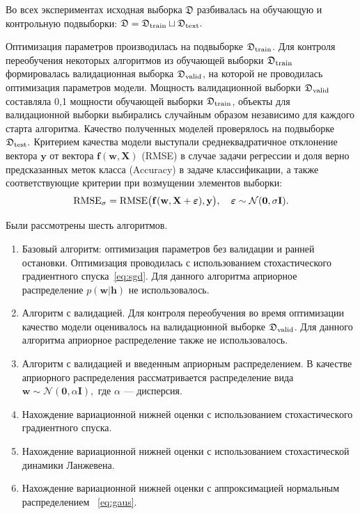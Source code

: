 Во всех экспериментах исходная выборка $\mathfrak{D}$ разбивалась на обучающую и контрольную подвыборки:
$
	\mathfrak{D} = \mathfrak{D}_\textnormal{train} \sqcup \mathfrak{D}_\textnormal{text}.
$

Оптимизация параметров производилась на подвыборке $\mathfrak{D}_\textnormal{train}$. Для контроля переобучения некоторых алгоритмов из обучающей выборки $\mathfrak{D}_\textnormal{train}$ формировалась валидационная выборка $\mathfrak{D}_\textnormal{valid}$, на которой не проводилась оптимизация параметров  модели. Мощность валидационной выборки $\mathfrak{D}_\textnormal{valid}$ составляла 0,1 мощности обучающей выборки  $\mathfrak{D}_\textnormal{train}$, объекты для валидационной выборки выбирались случайным образом независимо для каждого старта алгоритма.
Качество полученных моделей проверялось на подвыборке $\mathfrak{D}_\textnormal{test}.$ Критерием качества модели выступали среднеквадратичное отклонение вектора $\mathbf{y}$ от вектора $\mathbf{f}(\mathbf{w}, \mathbf{X})$ (RMSE) {в случае задачи регрессии и доля верно предсказанных меток класса (Accuracy) в задаче классификации}, а также { соответствующие критерии } при возмущении элементов выборки:
\begin{equation}
\label{eq:rmse}
	\textnormal{RMSE}_{\sigma} =\textnormal{RMSE}\bigl(\mathbf{f}( \mathbf{w}, \mathbf{X}+\boldsymbol{\varepsilon}), \mathbf{y}\bigr),  \quad \boldsymbol{\varepsilon} \sim \mathcal{N}(\mathbf{0}, \sigma \mathbf{I}).
\end{equation}

Были рассмотрены шесть алгоритмов.
\begin{enumerate}
\item Базовый алгоритм: оптимизация параметров без валидации и ранней остановки. Оптимизация проводилась с использованием стохастического градиентного спуска~\eqref{eq:sgd}. Для данного алгоритма априорное распределение $p(\mathbf{w}|\mathbf{h})$ не использовалось.
\item Алгоритм с валидацией. Для контроля переобучения во время оптимизации качество модели оценивалось на валидационной выборке $\mathfrak{D}_\textnormal{valid}$. Для данного алгоритма априорное распределение также не использовалось.
\item Алгоритм с валидацией и введенным априорным распределением. В качестве априорного распределения рассматривается распределение вида
$
	\mathbf{w} \sim \mathcal{N}(\mathbf{0}, \alpha \mathbf{I}), 
$
где $\alpha$ --- дисперсия.

\item Нахождение вариационной нижней оценки с использованием стохастического градиентного спуска.
\item Нахождение вариационной нижней оценки с использованием стохастической динамики Ланжевена.
\item Нахождение вариационной нижней оценки с аппроксимацией нормальным распределением ~\eqref{eq:gaus}.
\end{enumerate}




